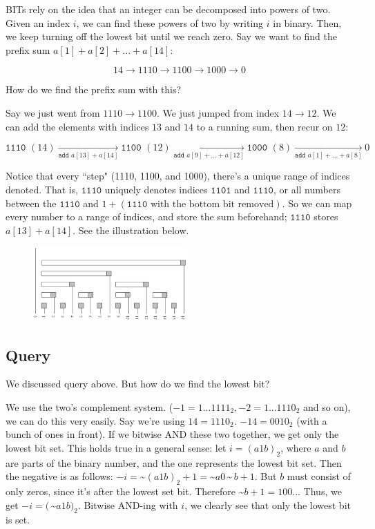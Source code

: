 \documentclass{article}
\begin{document}
    \noindent BITs rely on the idea that an integer can be decomposed into powers of two. Given an index $i$, we can find these powers of two by writing $i$ in binary. Then, we keep turning off the lowest bit until we reach zero. Say we want to find the prefix sum $a[1]+a[2]+...+a[14]$:
    
    $$ 14 \rightarrow 1110 \rightarrow 1100 \rightarrow 1000 \rightarrow 0 $$
    
    \noindent How do we find the prefix sum with this?
    
    \noindent Say we just went from $1110 \rightarrow 1100$. We just jumped from index $14 \rightarrow 12$. We can add the elements with indices $13$ and $14$ to a running sum, then recur on $12$:
    
    $$ \texttt{1110 }(14) \xrightarrow[{\texttt{add } a[13]+a[14]}]{} \texttt{1100 }(12) \xrightarrow[{\texttt{add } a[9]+...+a[12]}]{} \texttt{1000 }(8) \xrightarrow[{\texttt{add } a[1]+...+a[8]}]{} 0 $$
    
    \noindent Notice that every ``step" (1110, 1100, and 1000), there's a unique range of indices denoted. That is, $\texttt{1110}$ uniquely denotes indices $\texttt{1101}$ and $\texttt{1110}$, or all numbers between the $\texttt{1110}$ and $1+(\texttt{1110} \text{ with the bottom bit removed})$. So we can map every number to a range of indices, and store the sum beforehand; $\texttt{1110}$ stores $a[13]+a[14]$. See the illustration below.

    \begin{figure}
      \center
      \includegraphics[width=0.525\textwidth]{BIT.PNG}
    \end{figure}
    
    \subsection{Query}
        We discussed query above. But how do we find the lowest bit?
        
    \vspace{5pt}\noindent We use the two's complement system. ($-1 = 1...1111_2, -2 = 1...1110_2$ and so on), we can do this very easily. Say we're using $14 = 1110_2$. $-14 = 0010_2$ (with a bunch of ones in front). If we bitwise AND these two together, we get only the lowest bit set. This holds true in a general sense: let $i = (a1b)_2$, where $a$ and $b$ are parts of the binary number, and the one represents the lowest bit set. Then the negative is as follows: $-i = $\textasciitilde$(a1b)_2 + 1 = $\textasciitilde$ a0\,$\textasciitilde$ \,b + 1$. But $b$ must consist of only zeros, since it's after the lowest set bit. Therefore \textasciitilde $b + 1 = 100...$ Thus, we get $-i = (\,$\textasciitilde$ a1b)_2$. Bitwise AND-ing with $i$, we clearly see that only the lowest bit is set.
        
\end{document}

